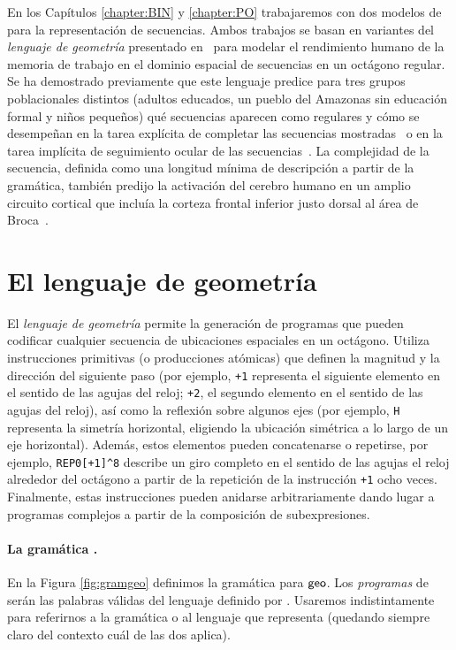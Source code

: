 
En los Capítulos \ref{chapter:BIN} y \ref{chapter:PO} trabajaremos con dos modelos de \lot para la representación de secuencias. Ambos trabajos se basan en variantes del \textit{lenguaje de geometría} presentado en~\cite{amalric2017language} para modelar el rendimiento humano de la memoria de trabajo en el dominio espacial de secuencias en un octágono regular. Se ha demostrado previamente que este lenguaje predice para tres grupos poblacionales distintos (adultos educados, un pueblo del Amazonas sin educación formal y niños pequeños) qué secuencias aparecen como regulares y cómo se desempeñan en la tarea explícita de completar las secuencias mostradas~\cite{amalric2017language} o en la tarea implícita de seguimiento ocular de las secuencias~\cite{f60}. La complejidad de la secuencia, definida como una longitud mínima de descripción a partir de la gramática, también predijo la activación del cerebro humano en un amplio circuito cortical que incluía la corteza frontal inferior justo dorsal al área de Broca~\cite{f60}.

\section*{El lenguaje de geometría \gramgeo}

El \textit{lenguaje de geometría} permite la generación de programas que pueden codificar cualquier secuencia de ubicaciones espaciales en un octágono. Utiliza instrucciones primitivas (o producciones atómicas) que definen la magnitud y la dirección del siguiente paso (por ejemplo, \verb#+1# representa el siguiente elemento en el sentido de las agujas del reloj; \verb#+2#, el segundo elemento en el sentido de las agujas del reloj), así como la reflexión sobre algunos ejes (por ejemplo, \verb#H# representa la simetría horizontal, eligiendo la ubicación simétrica a lo largo de un eje horizontal). Además, estos elementos pueden concatenarse o repetirse, por ejemplo, \verb#REP0[+1]^8# describe un giro completo en el sentido de las agujas el reloj alrededor del octágono a partir de la repetición de la instrucción \verb#+1# ocho veces. Finalmente, estas instrucciones pueden anidarse arbitrariamente dando lugar a programas complejos a partir de la composición de subexpresiones.

\paragraph{La gramática \gramgeo.}
En la Figura \ref{fig:gramgeo} definimos la gramática para ${\sf geo}$. Los {\em programas} de \gramgeo serán las palabras válidas del lenguaje definido por \gramgeo. Usaremos indistintamente \gramgeo para referirnos a la gramática o al lenguaje que representa (quedando siempre claro del contexto cuál de las dos aplica).

